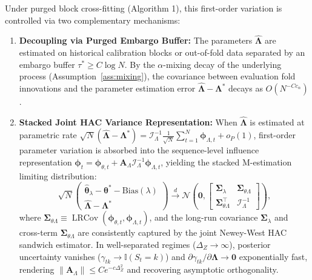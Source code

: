 \documentclass[twoside]{article}
\theoremstyle{definition}
\begin{document}
Under purged block cross-fitting (Algorithm 1), this first-order variation is controlled via two complementary mechanisms:
\begin{enumerate}
    \item \textbf{Decoupling via Purged Embargo Buffer:} The parameters $\hat{\boldsymbol{\Lambda}}$ are estimated on historical calibration blocks or out-of-fold data separated by an embargo buffer $\tau^* \ge C \log N$. By the $\alpha$-mixing decay of the underlying process (Assumption~\ref{ass:mixing}), the covariance between evaluation fold innovations and the parameter estimation error $\hat{\boldsymbol{\Lambda}} - \boldsymbol{\Lambda}^*$ decays as $O(N^{-C c_\alpha})$.
    \item \textbf{Stacked Joint HAC Variance Representation:} When $\hat{\boldsymbol{\Lambda}}$ is estimated at parametric rate $\sqrt{N}(\hat{\boldsymbol{\Lambda}} - \boldsymbol{\Lambda}^*) = \mathcal{I}_\Lambda^{-1} \frac{1}{\sqrt{N}}\sum_{t=1}^N \boldsymbol{\phi}_{\Lambda, t} + o_P(1)$, first-order parameter variation is absorbed into the sequence-level influence representation $\boldsymbol{\phi}_t = \boldsymbol{\phi}_{\theta, t} + \boldsymbol{A}_\Lambda \mathcal{I}_\Lambda^{-1} \boldsymbol{\phi}_{\Lambda, t}$, yielding the stacked M-estimation limiting distribution:
    \begin{equation}
        \sqrt{N} \begin{pmatrix} \hat{\boldsymbol{\theta}}_\lambda - \boldsymbol{\theta}^* - \mathrm{Bias}(\lambda) \\ \hat{\boldsymbol{\Lambda}} - \boldsymbol{\Lambda}^* \end{pmatrix} \xrightarrow{d} \mathcal{N}\left(\mathbf{0}, \begin{bmatrix} \boldsymbol{\Sigma}_\lambda & \boldsymbol{\Sigma}_{\theta \Lambda} \\ \boldsymbol{\Sigma}_{\theta \Lambda}^\top & \mathcal{I}_\Lambda^{-1} \end{bmatrix}\right),
    \end{equation}
    where $\boldsymbol{\Sigma}_{\theta \Lambda} \equiv \operatorname{LRCov}(\boldsymbol{\phi}_{\theta, t}, \boldsymbol{\phi}_{\Lambda, t})$, and the long-run covariance $\boldsymbol{\Sigma}_\lambda$ and cross-term $\boldsymbol{\Sigma}_{\theta \Lambda}$ are consistently captured by the joint Newey-West HAC sandwich estimator. In well-separated regimes ($\Delta_Z \to \infty$), posterior uncertainty vanishes ($\gamma_{tk} \to \mathbb{I}(S_t=k)$) and $\partial \gamma_{tk} / \partial \boldsymbol{\Lambda} \to \mathbf{0}$ exponentially fast, rendering $\|\boldsymbol{A}_\Lambda\| \le C e^{-c \Delta_Z^2}$ and recovering asymptotic orthogonality.
\end{enumerate}
\end{document}
